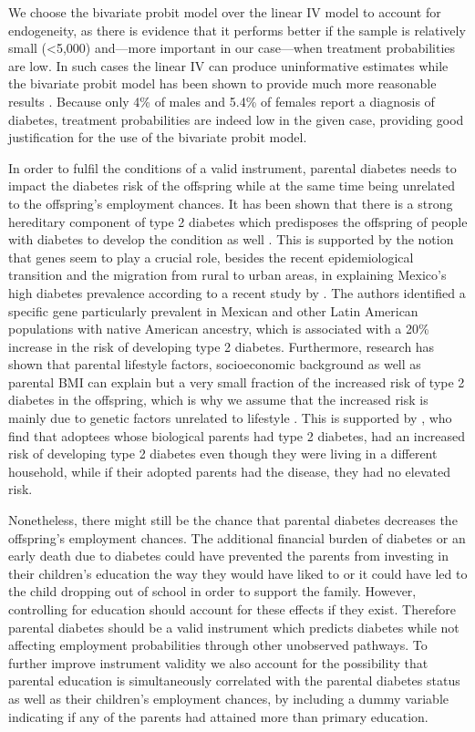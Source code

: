 We choose the bivariate probit model over the linear \ac{IV}
model to account for endogeneity, as there is evidence that it performs
better if the sample is relatively small (<5,000) and---more important
in our case---when treatment probabilities are low. In such cases
the linear \ac{IV} can produce uninformative estimates while the
bivariate probit model has been shown to provide much more reasonable
results \parencite{Chiburis2012}. Because only 4\% of males and
5.4\% of females report a diagnosis of diabetes, treatment probabilities
are indeed low in the given case, providing good justification for
the use of the bivariate probit model. 

In order to fulfil the conditions of a valid instrument,
parental diabetes needs to impact the diabetes risk of the offspring
while at the same time being unrelated to the offspring's employment
chances. It has been shown that there is a strong hereditary component
of type 2 diabetes which predisposes the offspring of people with
diabetes to develop the condition as well \parencite{Herder2011,TheInteractConsortium2013}.
This is supported by the notion that genes seem to play a crucial
role, besides the recent epidemiological transition and the migration
from rural to urban areas, in explaining Mexico's high diabetes prevalence
according to a recent study by \textcite{Williams2013}. The authors
identified a specific gene particularly prevalent in Mexican and other
Latin American populations with native American ancestry, which is
associated with a 20\% increase in the risk of developing type
2 diabetes. Furthermore, research has shown that parental lifestyle
factors, socioeconomic background as well as parental \ac{BMI} can
explain but a very small fraction of the increased risk of type 2
diabetes in the offspring, which is why we assume that the increased
risk is mainly due to genetic factors unrelated to lifestyle \parencite{Herder2011,TheInteractConsortium2013}.
This is supported by \textcite{Hemminki2010}, who find that adoptees
whose biological parents had type 2 diabetes, had an increased risk
of developing type 2 diabetes even though they were living in a different
household, while if their adopted parents had the disease, they had
no elevated risk. 

Nonetheless, there might still be the chance that parental
diabetes decreases the offspring's employment chances. The additional
financial burden of diabetes or an early death due to diabetes could
have prevented the parents from investing in their children's education
the way they would have liked to or it could have led to the child
dropping out of school in order to support the family. However, controlling
for education should account for these effects if they exist. Therefore
parental diabetes should be a valid instrument which predicts diabetes
while not affecting employment probabilities through other unobserved
pathways. To further improve instrument validity we also account for
the possibility that parental education is simultaneously correlated
with the parental diabetes status as well as their children's employment
chances, by including a dummy variable indicating if any of the parents
had attained more than primary education. 


